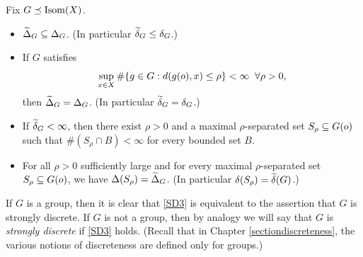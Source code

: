 \begin{proposition}
\label{propositionbasicmodified}
Fix $G\preceq\operatorname{Isom}(X)$.
\begin{itemize}
\item[(i)] $\widetilde\Delta_G \subseteq \Delta_G$. (In particular $\widetilde\delta_G\leq\delta_G$.)
\item[(ii)] If $G$ satisfies
\begin{equation}
\label{SD3}
\sup_{x\in X} \#\{g\in G:d(g(o),x)\leq \rho\} < \infty \;\;\forall \rho > 0,
\end{equation}
then $\widetilde\Delta_G = \Delta_G$. (In particular $\widetilde\delta_G = \delta_G$.)
\item[(iii)] If $\widetilde\delta_G < \infty$, then there exist $\rho > 0$ and a maximal $\rho$-separated set $S_\rho\subseteq G(o)$ such that $\#(S_\rho\cap B) < \infty$ for every bounded set $B$.
\item[(iv)] For all $\rho > 0$ sufficiently large and for every maximal $\rho$-separated set $S_\rho\subseteq G(o)$, we have $\Delta(S_\rho) = \widetilde\Delta_G$. (In particular $\delta(S_\rho) = \widetilde\delta(G)$.)
\end{itemize}
\end{proposition}
\begin{remark}
\label{remarkstronglydiscrete}
If $G$ is a group, then it is clear that \eqref{SD3} is equivalent to the assertion that $G$ is strongly discrete. If $G$ is not a group, then by analogy we will say that $G$ is \emph{strongly discrete} if \eqref{SD3} holds. (Recall that in Chapter \ref{sectiondiscreteness}, the various notions of discreteness are defined only for groups.)
\end{remark}


